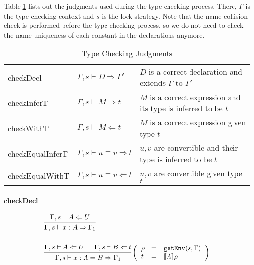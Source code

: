 \documentclass{article}
\theoremstyle{remark}
\begin{document}
Table \ref{tab:judgments} lists out the judgments used during the type checking process. There, $\Gamma$ is the type checking context and $s$ is the lock strategy. Note that the name collision check is performed before the type checking process, so we do not need to check the name uniqueness of each constant in the declarations anymore.
\begin{table}[h]
  \centering
  \begin{tabular}{l l p{2 in}}
    checkDecl   & $\Gamma,s \vdash D \Rightarrow \Gamma'$ & $D$ is a correct declaration and extends $\Gamma$ to $\Gamma'$ \\
    checkInferT & $\Gamma,s \vdash M \Rightarrow t$ & $M$ is a correct expression and its type is inferred to be $t$ \\
    checkWithT  & $\Gamma,s \vdash M \Leftarrow t$ & $M$ is a correct expression given type $t$ \\
    checkEqualInferT & $\Gamma,s \vdash u \equiv v \Rightarrow t $ & $u, v$ are convertible and their type is inferred to be $t$ \\ 
    checkEqualWithT  & $\Gamma,s \vdash u \equiv v \Leftarrow t  $ & $u, v$ are convertible given type $t$ 
  \end{tabular}
  \caption{Type Checking Judgments}
  \label{tab:judgments}
\end{table}

\paragraph{checkDecl}
\begin{align}
  &\begin{prooftree}
    \hypo{\Gamma,s \vdash A \Leftarrow U}
    \infer1{\Gamma,s \vdash x : A \Rightarrow \Gamma_1}
  \end{prooftree} \\
  \nonumber \\
  &\begin{prooftree}
    \hypo{\Gamma,s \vdash A \Leftarrow U}
    \hypo{\Gamma,s \vdash B \Leftarrow t}
    \infer2{\Gamma,s \vdash x : A = B \Rightarrow \Gamma_1}
  \end{prooftree}\left(\begin{array}{l l l}
                         \rho & = & \texttt{getEnv}(s, \Gamma) \\
                         t & = & \llbracket A \rrbracket \rho 
                       \end{array}\right)
\end{align}
\end{document}
